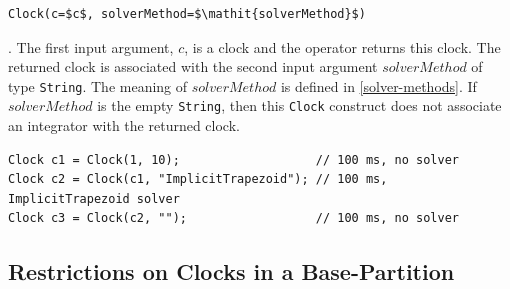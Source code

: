 \begin{operatordefinition*}[Clock]\label{modelica:clock-solver}
\begin{synopsis}\begin{lstlisting}
Clock(c=$c$, solverMethod=$\mathit{solverMethod}$)
\end{lstlisting}\end{synopsis}
\begin{semantics}
.
The first input argument, $c$, is a clock and the operator returns this clock.
The returned clock is associated with the second input argument $\mathit{solverMethod}$ of type \lstinline!String!.
The meaning of $\mathit{solverMethod}$ is defined in \cref{solver-methods}.
If $\mathit{solverMethod}$ is the empty \lstinline!String!, then this \lstinline!Clock! construct does not associate an integrator with the returned clock.

\begin{example}
\begin{lstlisting}[language=modelica]
Clock c1 = Clock(1, 10);                   // 100 ms, no solver
Clock c2 = Clock(c1, "ImplicitTrapezoid"); // 100 ms, ImplicitTrapezoid solver
Clock c3 = Clock(c2, "");                  // 100 ms, no solver
\end{lstlisting}
\end{example}
\end{semantics}
\end{operatordefinition*}

\subsection{Restrictions on Clocks in a Base-Partition}\label{restrictions-on-clocks-in-a-base-partition}


